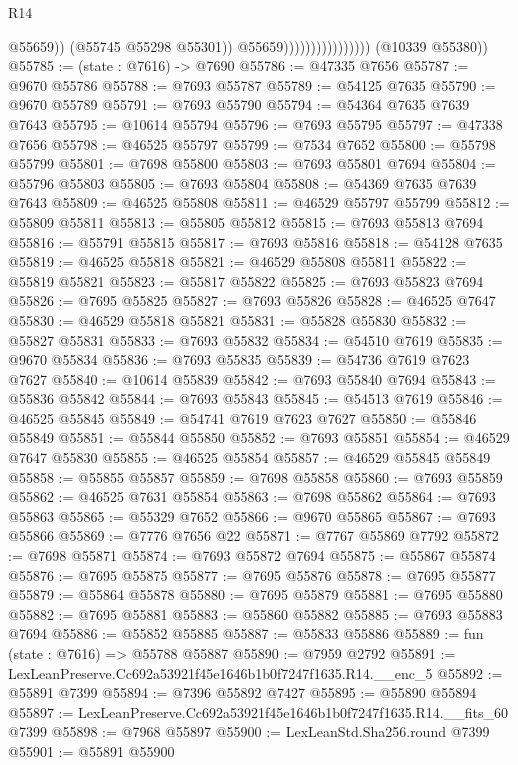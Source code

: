 \begin{lexlean}{R14}
\begin{coremodule}
                                            @55659))
                                        (@55745 @55298 @55301))
                                      @55659))))))))))))))))
      (@10339 @55380))
@55785 := (state : @7616) -> @7690
@55786 := @47335 @7656
@55787 := @9670 @55786
@55788 := @7693 @55787
@55789 := @54125 @7635
@55790 := @9670 @55789
@55791 := @7693 @55790
@55794 := @54364 @7635 @7639 @7643
@55795 := @10614 @55794
@55796 := @7693 @55795
@55797 := @47338 @7656
@55798 := @46525 @55797
@55799 := @7534 @7652
@55800 := @55798 @55799
@55801 := @7698 @55800
@55803 := @7693 @55801 @7694
@55804 := @55796 @55803
@55805 := @7693 @55804
@55808 := @54369 @7635 @7639 @7643
@55809 := @46525 @55808
@55811 := @46529 @55797 @55799
@55812 := @55809 @55811
@55813 := @55805 @55812
@55815 := @7693 @55813 @7694
@55816 := @55791 @55815
@55817 := @7693 @55816
@55818 := @54128 @7635
@55819 := @46525 @55818
@55821 := @46529 @55808 @55811
@55822 := @55819 @55821
@55823 := @55817 @55822
@55825 := @7693 @55823 @7694
@55826 := @7695 @55825
@55827 := @7693 @55826
@55828 := @46525 @7647
@55830 := @46529 @55818 @55821
@55831 := @55828 @55830
@55832 := @55827 @55831
@55833 := @7693 @55832
@55834 := @54510 @7619
@55835 := @9670 @55834
@55836 := @7693 @55835
@55839 := @54736 @7619 @7623 @7627
@55840 := @10614 @55839
@55842 := @7693 @55840 @7694
@55843 := @55836 @55842
@55844 := @7693 @55843
@55845 := @54513 @7619
@55846 := @46525 @55845
@55849 := @54741 @7619 @7623 @7627
@55850 := @55846 @55849
@55851 := @55844 @55850
@55852 := @7693 @55851
@55854 := @46529 @7647 @55830
@55855 := @46525 @55854
@55857 := @46529 @55845 @55849
@55858 := @55855 @55857
@55859 := @7698 @55858
@55860 := @7693 @55859
@55862 := @46525 @7631 @55854
@55863 := @7698 @55862
@55864 := @7693 @55863
@55865 := @55329 @7652
@55866 := @9670 @55865
@55867 := @7693 @55866
@55869 := @7776 @7656 @22
@55871 := @7767 @55869 @7792
@55872 := @7698 @55871
@55874 := @7693 @55872 @7694
@55875 := @55867 @55874
@55876 := @7695 @55875
@55877 := @7695 @55876
@55878 := @7695 @55877
@55879 := @55864 @55878
@55880 := @7695 @55879
@55881 := @7695 @55880
@55882 := @7695 @55881
@55883 := @55860 @55882
@55885 := @7693 @55883 @7694
@55886 := @55852 @55885
@55887 := @55833 @55886
@55889 := fun (state : @7616) => @55788 @55887
@55890 := @7959 @2792
@55891 := LexLeanPreserve.Cc692a53921f45e1646b1b0f7247f1635.R14.__enc_5
@55892 := @55891 @7399
@55894 := @7396 @55892 @7427
@55895 := @55890 @55894
@55897 := LexLeanPreserve.Cc692a53921f45e1646b1b0f7247f1635.R14.__fits_60 @7399
@55898 := @7968 @55897
@55900 := LexLeanStd.Sha256.round @7399
@55901 := @55891 @55900

\end{coremodule}
\end{lexlean}
